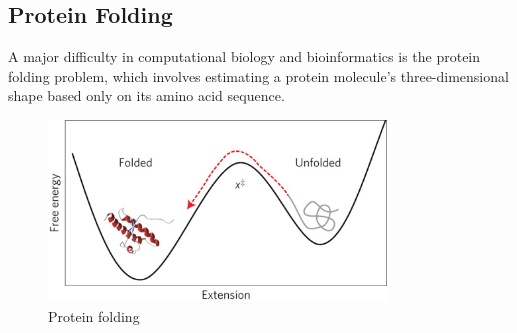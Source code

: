 \documentclass[12pt]{article}
\begin{document}
    \subsection{Protein Folding}
    A major difficulty in computational biology and bioinformatics is the protein folding problem, which involves estimating a protein molecule's three-dimensional shape based only on its amino acid sequence.
    \begin{figure}[h]
        \centering
        \includegraphics[width=0.8\textwidth]{figures/protein.jpeg}
        \caption{Protein folding}
    \end{figure}
    
\end{document}
